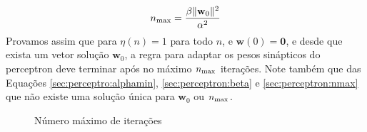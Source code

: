   \begin{equation}\label{sec:perceptron:nmax}
    n_{\rm max}=\frac{\beta\Vert\textbf{w}_0\Vert^2}{\alpha^2}
  \end{equation}
  Provamos assim que para $\eta(n)=1$ para todo $n$, e $\textbf{w}(0)=\textbf{0}$, e desde que exista um vetor solução $\textbf{w}_0$, a regra para adaptar os pesos sinápticos do perceptron deve terminar após no máximo $n_{\rm max}$ iterações. Note também que das Equações \ref{sec:perceptro:alphamin}, \ref{sec:perceptron:beta} e \ref{sec:perceptron:nmax} que não existe uma solução única para $\textbf{w}_0$ ou $n_{\rm max}$.



  \begin{figure}[!htpb] 
    \caption{Número máximo de iterações}
    \label{sec:perceptron:demo}
  \end{figure}
